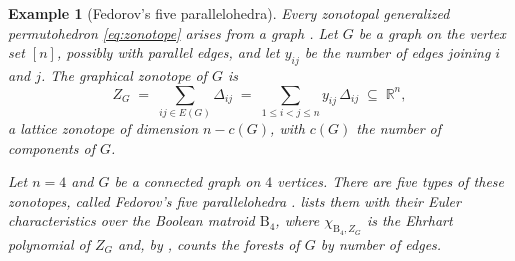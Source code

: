 \documentclass[11pt,a4paper,reqno]{amsart}
\theoremstyle{results}
\theoremstyle{definitions}
\newtheorem{example}[thm]{Example}
\def\R{\mathbb{R}}
\newcommand{\B}{\textrm{B}}
\begin{document}
\newcommand{\zbox}[1]{\parbox[c][34pt][c]{36pt}{\centering\scalebox{0.50}{#1}}}
\newcommand{\gfour}[1]{\begin{tikzpicture}[scale=0.62,line width=0.8pt,
    baseline=(current bounding box.center)]
  \path (0,0) coordinate (a) (1,0) coordinate (b) (1,1) coordinate (c) (0,1) coordinate (d);
  \draw[gA!75!black] #1;
  \foreach \p in {a,b,c,d} \fill (\p) circle (2.4pt);
  \end{tikzpicture}}

\begin{example}[Fedorov's five parallelohedra]\label{ex:parallelohedra}
  Every zonotopal generalized permutohedron \eqref{eq:zonotope} arises from a graph
  \cite[\S 2]{postnikov2009permutohedra}.  Let $G$ be a graph
on the vertex set $[n]$, possibly with parallel edges, and let $y_{ij}$ be the
number of edges joining $i$ and $j$.  The \emph{graphical zonotope} of $G$ is
\[
  Z_G \;=\; \sum_{ij \in E(G)} \Delta_{ij}
        \;=\; \sum_{1 \leqslant i < j \leqslant n} y_{ij}\, \Delta_{ij}
        \;\subseteq\; \R^{n},
\]
a lattice zonotope of dimension $n - c(G)$, with $c(G)$ the number of components of $G$.

  Let $n = 4$ and $G$ be a connected graph on $4$ vertices. There are five types of these zonotopes, called Fedorov's
  five parallelohedra \cite{fedorov1885nachala}.  lists them with their Euler
  characteristics over the Boolean matroid $\B_4$, where $\chi_{\B_4,Z_G}$ is the
  Ehrhart polynomial of $Z_G$ and, by , counts the forests of $G$
  by number of edges.



\end{example}
\end{document}
